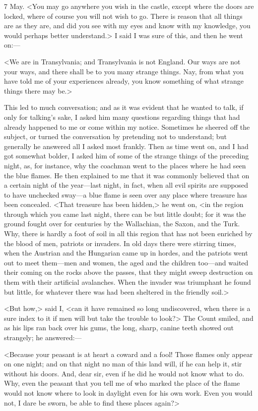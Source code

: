 \begin{diary}{7 May.}
<You may go anywhere you wish in the castle, except where the doors are locked, where of course you will not wish to go. There is reason that all things are as they are, and did you see with my eyes and know with my knowledge, you would perhaps better understand.> I said I was sure of this, and then he went on:—

<We are in Transylvania; and Transylvania is not England. Our ways are not your ways, and there shall be to you many strange things. Nay, from what you have told me of your experiences already, you know something of what strange things there may be.>

This led to much conversation; and as it was evident that he wanted to talk, if only for talking's sake, I asked him many questions regarding things that had already happened to me or come within my notice. Sometimes he sheered off the subject, or turned the conversation by pretending not to understand; but generally he answered all I asked most frankly. Then as time went on, and I had got somewhat bolder, I asked him of some of the strange things of the preceding night, as, for instance, why the coachman went to the places where he had seen the blue flames. He then explained to me that it was commonly believed that on a certain night of the year—last night, in fact, when all evil spirits are supposed to have unchecked sway—a blue flame is seen over any place where treasure has been concealed. <That treasure has been hidden,> he went on, <in the region through which you came last night, there can be but little doubt; for it was the ground fought over for centuries by the Wallachian, the Saxon, and the Turk. Why, there is hardly a foot of soil in all this region that has not been enriched by the blood of men, patriots or invaders. In old days there were stirring times, when the Austrian and the Hungarian came up in hordes, and the patriots went out to meet them—men and women, the aged and the children too—and waited their coming on the rocks above the passes, that they might sweep destruction on them with their artificial avalanches. When the invader was triumphant he found but little, for whatever there was had been sheltered in the friendly soil.>

<But how,> said I, <can it have remained so long undiscovered, when there is a sure index to it if men will but take the trouble to look?> The Count smiled, and as his lips ran back over his gums, the long, sharp, canine teeth showed out strangely; he answered:—

<Because your peasant is at heart a coward and a fool! Those flames only appear on one night; and on that night no man of this land will, if he can help it, stir without his doors. And, dear sir, even if he did he would not know what to do. Why, even the peasant that you tell me of who marked the place of the flame would not know where to look in daylight even for his own work. Even you would not, I dare be sworn, be able to find these places again?>


\end{diary}
